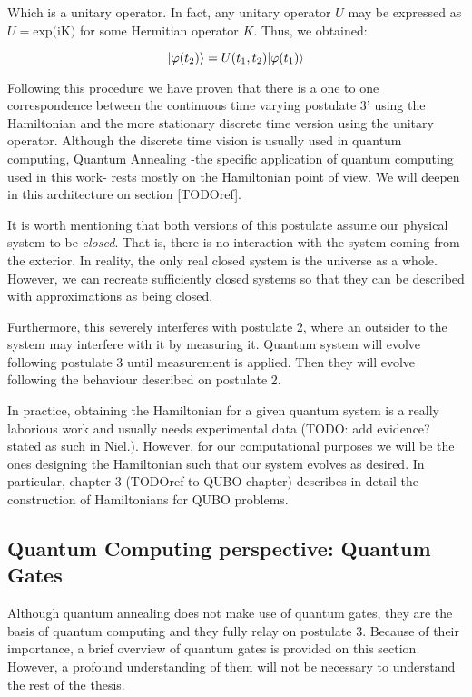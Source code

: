 Which is a unitary operator. In fact, any unitary operator $U$ may be expressed as $U = \text{exp(iK)}$ for some Hermitian operator $K$. Thus, we obtained: 

$$ |\varphi(t_2)\rangle = U(t_1, t_2) |\varphi(t_1)\rangle $$

Following this procedure we have proven that there is a one to one correspondence between the continuous time varying postulate 3' using the Hamiltonian and the more stationary discrete time version using the unitary operator. Although the discrete time vision is usually used in quantum computing, Quantum Annealing -the specific application of quantum computing used in this work- rests mostly on the Hamiltonian point of view. We will deepen in this architecture on section [TODOref].

It is worth mentioning that both versions of this postulate assume our physical system to be \emph{closed}. That is, there is no interaction with the system coming from the exterior. In reality, the only real closed system is the universe as a whole. However, we can recreate sufficiently closed systems so that they can be described with approximations as being closed. 

Furthermore, this severely interferes with postulate 2, where an outsider to the system may interfere with it by measuring it. Quantum system will evolve following postulate 3 until measurement is applied. Then they will evolve following the behaviour described on postulate 2.

In practice, obtaining the Hamiltonian for a given quantum system is a really laborious work and usually needs experimental data (TODO: add evidence? stated as such in Niel.). However, for our computational purposes we will be the ones designing the Hamiltonian such that our system evolves as desired. In particular, chapter 3 (TODOref to QUBO chapter) describes in detail the construction of Hamiltonians for QUBO problems.

\subsection{Quantum Computing perspective: Quantum Gates}

Although quantum annealing does not make use of quantum gates, they are the basis of quantum computing and they fully relay on postulate 3. Because of their importance, a brief overview of quantum gates is provided on this section. However, a profound understanding of them will not be necessary to understand the rest of the thesis.

